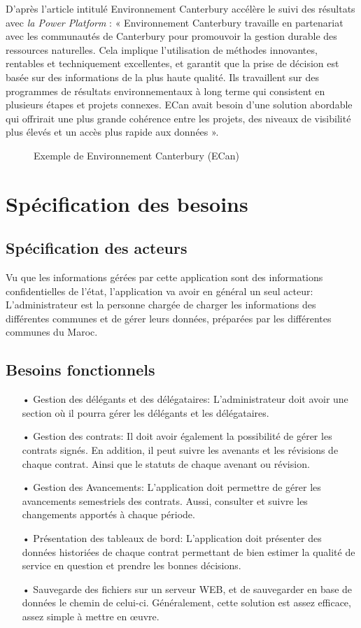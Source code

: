 D’après l'article intitulé Environnement Canterbury accélère le suivi
des
résultats avec \emph{la Power Platform} :
« Environnement Canterbury travaille en partenariat avec les communautés
de
Canterbury pour promouvoir la gestion durable des ressources
naturelles. Cela
implique l'utilisation de méthodes innovantes, rentables et
techniquement
excellentes, et garantit que la prise de décision est basée sur des
informations
de la plus haute qualité. Ils travaillent sur des programmes de
résultats
environnementaux à long terme qui consistent en plusieurs étapes et
projets
connexes. ECan avait besoin d'une solution abordable qui offrirait une
plus
grande cohérence entre les projets, des niveaux de visibilité plus
élevés et un
accès plus rapide aux données ».
\begin{figure}[H]
    \begin{center}
        \caption{Exemple de Environnement Canterbury (ECan)}
    \end{center}
\end{figure}
\newpage
\section{Spécification des besoins}

\subsection{Spécification des acteurs}
Vu que les informations gérées par cette application sont des informations confidentielles de l'état, l'application va avoir en général un seul acteur:
L'administrateur est la personne chargée de charger les informations des différentes communes et de gérer leurs données, préparées par les différentes communes du Maroc.
\subsection{Besoins fonctionnels}
\begin{itemize}
    \item[•] Gestion des délégants et des délégataires: L'administrateur doit avoir
          une section où il pourra gérer les délégants et les délégataires.
    \item[•] Gestion des contrats: Il doit avoir également la possibilité de gérer les contrats signés. En addition, il peut suivre les avenants et les révisions de chaque contrat. Ainsi que le statuts de chaque avenant ou révision.
    \item[•] Gestion des Avancements: L'application doit permettre de gérer les avancements semestriels des contrats. Aussi, consulter et suivre les changements apportés à chaque période.
    \item[•] Présentation des tableaux de bord: L'application doit présenter des données historiées de chaque contrat permettant de bien estimer la qualité de service en question et prendre les bonnes décisions.
    \item[•] Sauvegarde des fichiers sur un serveur WEB, et de sauvegarder en base de données le chemin de celui-ci. Généralement, cette solution est assez efficace, assez simple à mettre en œuvre.
\end{itemize}
